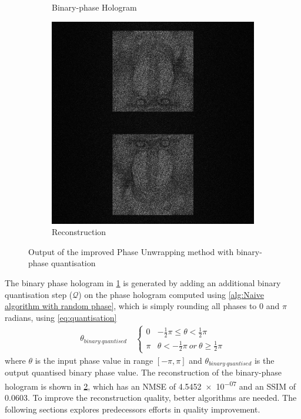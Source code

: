 \begin{figure}[H]
\begin{subfigure}[t]{0.3\textwidth}
    \caption{Binary-phase Hologram}
    \label{fig:Naive_binary_Holo}
  \end{subfigure}
  \hfill
  \begin{subfigure}[t]{0.3\textwidth}
    \centering
    \includegraphics[width=\textwidth]{Naive_binary_Recon.jpg}
    \caption{Reconstruction}
    \label{fig:Naive_binary_Recon}
  \end{subfigure}
  \caption{Output of the improved Phase Unwrapping method with binary-phase quantisation}
  \label{fig:Output of the improved Naive method with binary-phase quantisation}
\end{figure}

The binary phase hologram in \cref{fig:Naive_binary_Holo} is generated by adding an additional binary quantisation step ($\mathcal{Q}$) on the phase hologram computed using \cref{alg:Naive algorithm with random phase}, which is simply rounding all phases to 0 and $\pi$ radians, using \cref{eq:quantisation}
\begin{align}
  \theta_{binary\ quantised}   & \                       \left\{
  \begin{array}{ll}
    0 & -\frac{1}{2} \pi \leqslant \theta < \frac{1}{2} \pi          \\
    \pi & \theta < -\frac{1}{2} \pi \ or\ \theta \geqslant  \frac{1}{2} \pi
  \end{array}
  \right.
  \label{eq:quantisation}
\end{align}
where $\theta$ is the input phase value in range $[-\pi, \pi]$ and $\theta_{binary\ quantised}$ is the output quantised binary phase value. The reconstruction of the binary-phase hologram is shown in \cref{fig:Naive_binary_Recon}, which has an NMSE of \num{4.5452e-07} and an SSIM of 0.0603. To improve the reconstruction quality, better algorithms are needed. The following sections explores predecessors efforts in quality improvement.

